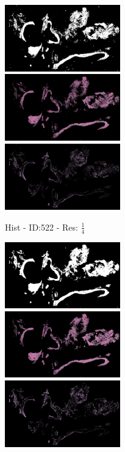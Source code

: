 \documentclass[letterpaper,10pt,oneside]{article}
\begin{document}
\begin{figure}[hbtp]
\begin{subfigure}[b]{5cm}
    \includegraphics[width=5cm]{visualization/results/histogramSeg/res_reduce_4/Region_0_PO13-00522A1_1_2_201305171639.png}
    \includegraphics[width=5cm]{visualization/results/histogramSeg/res_reduce_4/Region_1_PO13-00522A1_1_2_201305171639.png}
    \includegraphics[width=5cm]{visualization/results/histogramSeg/res_reduce_4/Region_2_PO13-00522A1_1_2_201305171639.png}
    \caption{Hist - ID:522 - Res: $\frac{1}{4}$}
  \end{subfigure}
  \begin{subfigure}[b]{5cm}
    \includegraphics[width=5cm]{visualization/results/histogramSeg/res_reduce_5/Region_0_PO13-00522A1_1_2_201305171639.png}
    \includegraphics[width=5cm]{visualization/results/histogramSeg/res_reduce_5/Region_1_PO13-00522A1_1_2_201305171639.png}
    \includegraphics[width=5cm]{visualization/results/histogramSeg/res_reduce_5/Region_2_PO13-00522A1_1_2_201305171639.png}

\end{subfigure}
\end{figure}
\end{document}
